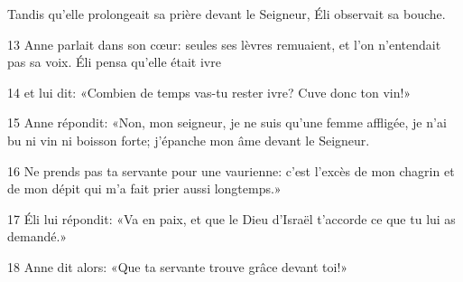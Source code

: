 Tandis qu’elle prolongeait sa prière devant le Seigneur, Éli observait sa bouche.

13 Anne parlait dans son cœur: seules ses lèvres remuaient, et l’on n’entendait pas sa voix. Éli pensa qu’elle était ivre

14 et lui dit: «Combien de temps vas-tu rester ivre? Cuve donc ton vin!»

15 Anne répondit: «Non, mon seigneur, je ne suis qu’une femme affligée, je n’ai bu ni vin ni boisson forte; j’épanche mon âme devant le Seigneur.

16 Ne prends pas ta servante pour une vaurienne: c’est l’excès de mon chagrin et de mon dépit qui m’a fait prier aussi longtemps.»

17 Éli lui répondit: «Va en paix, et que le Dieu d’Israël t’accorde ce que tu lui as demandé.»

18 Anne dit alors: «Que ta servante trouve grâce devant toi!» 